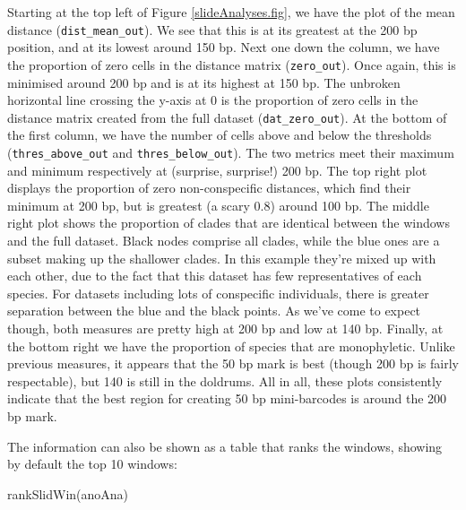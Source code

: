 \documentclass{article}
\begin{document}
Starting at the top left of Figure \ref{slideAnalyses.fig}, we have the plot of the mean distance (\verb|dist_mean_out|). We see that this is at its greatest at the 200 bp position, and at its lowest around 150 bp. Next one down the column, we have the proportion of zero cells in the distance matrix (\verb|zero_out|). Once again, this is minimised around 200 bp and is at its highest at 150 bp. The unbroken horizontal line crossing the y-axis at 0 is the proportion of zero cells in the distance matrix created from the full dataset (\verb|dat_zero_out|). At the bottom of the first column, we have the number of cells above and below the thresholds (\verb|thres_above_out| and \verb|thres_below_out|). The two metrics meet their maximum and minimum respectively at (surprise, surprise!) 200 bp. The top right plot displays the proportion of zero non-conspecific distances, which find their minimum at 200 bp, but is greatest (a scary 0.8) around 100 bp. The middle right plot shows the proportion of clades that are identical between the windows and the full dataset. Black nodes comprise all clades, while the blue ones are a subset making up the shallower clades. In this example they're mixed up with each other, due to the fact that this dataset has few representatives of each species. For datasets including lots of conspecific individuals, there is greater separation between the blue and the black points. As we've come to expect though, both measures are pretty high at 200 bp and low at 140 bp. Finally, at the bottom right we have the proportion of species that are monophyletic. Unlike previous measures, it appears that the 50 bp mark is best (though 200 bp is fairly respectable), but 140 is still in the doldrums. All in all, these plots consistently indicate that the best region for creating 50 bp mini-barcodes is around the 200 bp mark.

The information can also be shown as a table that ranks the windows, showing by default the top 10 windows:

\begin{console}
rankSlidWin(anoAna)
\end{console}
\end{document}
